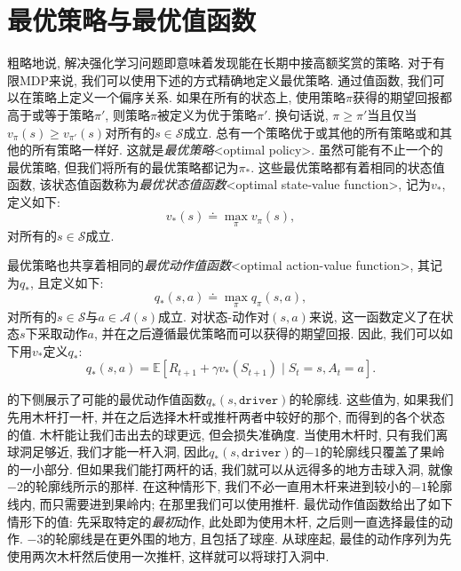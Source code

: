 \section{最优策略与最优值函数}\label{sec:3.6}

粗略地说, 解决强化学习问题即意味着发现能在长期中接高额奖赏的策略. 对于有限MDP来说, 我们可以使用下述的方式精确地定义最优策略. 通过值函数, 我们可以在策略上定义一个偏序关系. 如果在所有的状态上, 使用策略$\pi$获得的期望回报都高于或等于策略$\pi'$, 则策略$\pi$被定义为优于策略$\pi'$. 换句话说, $\pi \geq \pi'$当且仅当$v_{\pi}(s) \geq v_{\pi'}(s)$对所有的$s \in \mathcal{S}$成立. 总有一个策略优于或其他的所有策略或和其他的所有策略一样好. 这就是\emph{最优策略}<optimal policy>. 虽然可能有不止一个的最优策略, 但我们将所有的最优策略都记为$\pi_{*}$. 这些最优策略都有着相同的状态值函数, 该状态值函数称为\emph{最优状态值函数}<optimal state-value function>, 记为$v_*$, 定义如下:
\begin{equation}\label{eq:3.15}
v_*(s) \doteq \max_{\pi}v_{\pi}(s),
\end{equation}
对所有的$s \in \mathcal{S}$成立.

最优策略也共享着相同的\emph{最优动作值函数}<optimal action-value function>, 其记为$q_*$, 且定义如下:
\begin{equation}\label{eq:3.16}
q_*(s, a) \doteq \max_{\pi}q_{\pi}(s, a),
\end{equation}
对所有的$s \in \mathcal{S}$与$a \in \mathcal{A}(s)$成立. 对状态-动作对$(s, a)$来说, 这一函数定义了在状态$s$下采取动作$a$, 并在之后遵循最优策略而可以获得的期望回报. 因此, 我们可以如下用$v_*$定义$q_*$:
\begin{equation}\label{eq:3.17}
q_*(s, a) = \mathbb{E}[R_{t + 1} + \gamma v_*(S_{t + 1}) \mid S_t = s, A_t = a].
\end{equation}

\begin{exam}[高尔夫的最优值函数]
的下侧展示了可能的最优动作值函数$q_*(s, \mathtt{driver})$的轮廓线. 这些值为, 如果我们先用木杆打一杆, 并在之后选择木杆或推杆两者中较好的那个, 而得到的各个状态的值. 木杆能让我们击出去的球更远, 但会损失准确度. 当使用木杆时, 只有我们离球洞足够近, 我们才能一杆入洞, 因此$q_*(s, \mathtt{driver})$的$-1$的轮廓线只覆盖了果岭的一小部分. 但如果我们能打两杆的话, 我们就可以从远得多的地方击球入洞, 就像$-2$的轮廓线所示的那样. 在这种情形下, 我们不必一直用木杆来进到较小的$-1$轮廓线内, 而只需要进到果岭内; 在那里我们可以使用推杆. 最优动作值函数给出了如下情形下的值: 先采取特定的\emph{最初}动作, 此处即为使用木杆, 之后则一直选择最佳的动作. $-3$的轮廓线是在更外围的地方, 且包括了球座. 从球座起, 最佳的动作序列为先使用两次木杆然后使用一次推杆, 这样就可以将球打入洞中.
\end{exam}

